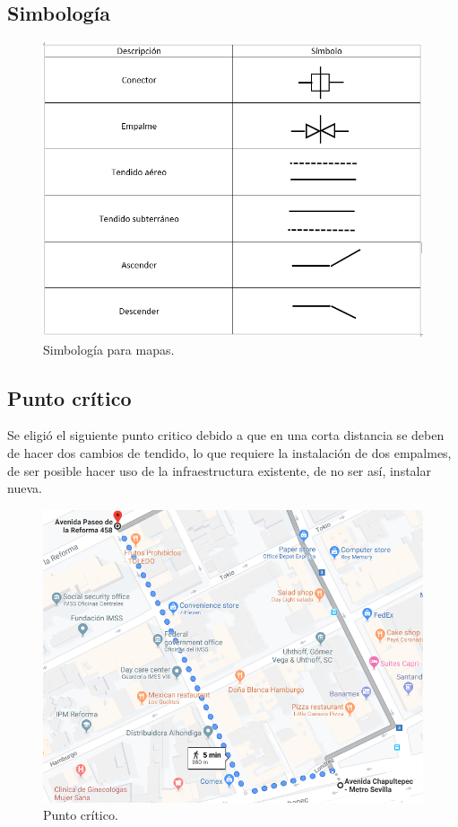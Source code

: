 \documentclass[12pt,letterpaper]{article}
\begin{document}
\subsection{Simbología}
\begin{figure}[ht]
    \centering
    \includegraphics[scale=.7]{imagenes/simbo.png}
    \caption{Simbología para mapas.}
\end{figure}

\newpage
\subsection{Punto crítico}
Se eligió el siguiente punto critico debido a que en una corta distancia se deben de hacer 
dos cambios de tendido, lo que requiere la instalación de dos empalmes, de ser posible hacer 
uso de la infraestructura existente, de no ser así, instalar nueva.
\begin{figure}[ht]
    \centering
    \includegraphics[scale=.8]{imagenes/puntocritico.png}
    \caption{Punto crítico.}
\end{figure}
\end{document}
